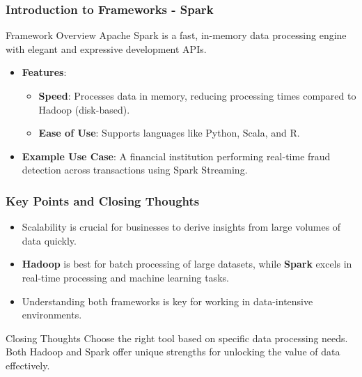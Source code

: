 \documentclass[aspectratio=169]{beamer}
\begin{document}
\begin{frame}[fragile]
    \frametitle{Introduction to Frameworks - Spark}
    \begin{block}{Framework Overview}
        Apache Spark is a fast, in-memory data processing engine with elegant and expressive development APIs.
    \end{block}
    
    \begin{itemize}
        \item \textbf{Features}:
              \begin{itemize}
                  \item \textbf{Speed}: Processes data in memory, reducing processing times compared to Hadoop (disk-based).
                  \item \textbf{Ease of Use}: Supports languages like Python, Scala, and R.
              \end{itemize}
        \item \textbf{Example Use Case}:
              A financial institution performing real-time fraud detection across transactions using Spark Streaming.
    \end{itemize}
\end{frame}

\begin{frame}[fragile]
    \frametitle{Key Points and Closing Thoughts}
    \begin{itemize}
        \item Scalability is crucial for businesses to derive insights from large volumes of data quickly.
        \item \textbf{Hadoop} is best for batch processing of large datasets, while \textbf{Spark} excels in real-time processing and machine learning tasks.
        \item Understanding both frameworks is key for working in data-intensive environments.
    \end{itemize}
    
    \begin{block}{Closing Thoughts}
        Choose the right tool based on specific data processing needs. Both Hadoop and Spark offer unique strengths for unlocking the value of data effectively.
    \end{block}
\end{frame}
\end{document}
